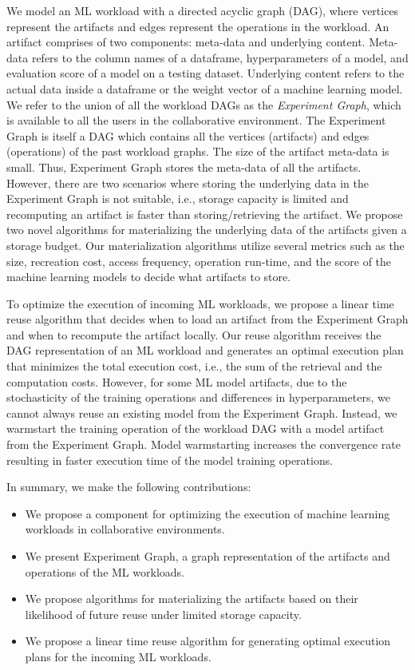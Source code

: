 We model an ML workload with a directed acyclic graph (DAG), where vertices represent the artifacts and edges represent the operations in the workload.
An artifact comprises of two components: meta-data and underlying content.
Meta-data refers to the column names of a dataframe, hyperparameters of a model, and evaluation score of a model on a testing dataset.
Underlying content refers to the actual data inside a dataframe or the weight vector of a machine learning model.
We refer to the union of all the workload DAGs as the \textit{Experiment Graph}, which is available to all the users in the collaborative environment.
The Experiment Graph is itself a DAG which contains all the vertices (artifacts) and edges (operations) of the past workload graphs.
The size of the artifact meta-data is small.
Thus, Experiment Graph stores the meta-data of all the artifacts.
However, there are two scenarios where storing the underlying data in the Experiment Graph is not suitable, i.e., storage capacity is limited and recomputing an artifact is faster than storing/retrieving the artifact.
We propose two novel algorithms for materializing the underlying data of the artifacts given a storage budget.
Our materialization algorithms utilize several metrics such as the size, recreation cost, access frequency, operation run-time, and the score of the machine learning models to decide what artifacts to store.

To optimize the execution of incoming ML workloads, we propose a linear time reuse algorithm that decides when to load an artifact from the Experiment Graph and when to recompute the artifact locally.
Our reuse algorithm receives the DAG representation of an ML workload and generates an optimal execution plan that minimizes the total execution cost, i.e., the sum of the retrieval and the computation costs.
However, for some ML model artifacts, due to the stochasticity of the training operations and differences in hyperparameters, we cannot always reuse an existing model from the Experiment Graph.
Instead, we warmstart the training operation of the workload DAG with a model artifact from the Experiment Graph.
Model warmstarting increases the convergence rate resulting in faster execution time of the model training operations.

In summary, we make the following contributions:
\begin{itemize}
\item We propose a component for optimizing the execution of machine learning workloads in collaborative environments.
\item We present Experiment Graph, a graph representation of the artifacts and operations of the ML workloads.
\item We propose algorithms for materializing the artifacts based on their likelihood of future reuse under limited storage capacity.
\item We propose a linear time reuse algorithm for generating optimal execution plans for the incoming ML workloads.
\end{itemize}


